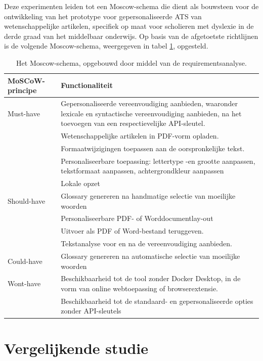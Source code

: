 Deze experimenten leiden tot een Moscow-schema die dient als bouwsteen voor de ontwikkeling van het prototype voor gepersonaliseerde ATS van wetenschappelijke artikelen, specifiek op maat voor scholieren met dyslexie in de derde graad van het middelbaar onderwijs. Op basis van de afgetoetste richtlijnen is de volgende Moscow-schema, weergegeven in tabel \ref{img:moscow-table}, opgesteld.

\begin{center}
	\begin{table}[H]
	\begin{tabular}{ | m{4cm} | m{12cm} | } 
		\hline
		\textbf{MoSCoW-principe} & Functionaliteit \\
		\hline
		Must-have & Gepersonaliseerde vereenvoudiging aanbieden, waaronder lexicale en syntactische vereenvoudiging aanbieden, na het toevoegen van een respectievelijke API-sleutel. \\
		& Wetenschappelijke artikelen in PDF-vorm opladen. \\
		& Formaatwijzigingen toepassen aan de oorspronkelijke tekst. \\
		& Personaliseerbare toepassing: lettertype -en grootte aanpassen, tekstformaat aanpassen, achtergrondkleur aanpassen \\
		& Lokale opzet \\
		\hline
		Should-have & Glossary genereren na handmatige selectie van moeilijke woorden \\
		& Personaliseerbare PDF- of Worddocumentlay-out \\
		& Uitvoer als PDF of Word-bestand teruggeven. \\
		& Tekstanalyse voor en na de vereenvoudiging aanbieden. \\
		\hline
		Could-have & Glossary genereren na automatische selectie van moeilijke woorden \\
		\hline
		Wont-have & Beschikbaarheid tot de tool zonder Docker Desktop, in de vorm van online webtoepassing of browserextensie. \\
		& Beschikbaarheid tot de standaard- en gepersonaliseerde opties zonder API-sleutels \\
		\hline
	\end{tabular}
	\caption{Het Moscow-schema, opgebouwd door middel van de requirementsanalyse.}
	\label{img:moscow-table}
	\end{table}
\end{center}

\section{Vergelijkende studie}
\label{sec:vergelijkende-studie}

